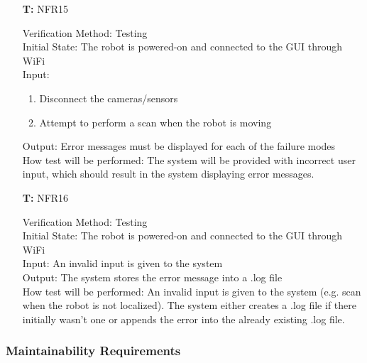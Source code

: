 \documentclass[12pt, titlepage]{article}
\newcounter{tnum} %
\begin{document}
\begin{itemize}

\item[\textbf{T\refstepcounter{tnum}\thetnum:}]{NFR15\\}

Verification Method: Testing\\					
Initial State: 	The robot is powered-on and connected to the GUI through WiFi	\\
Input: \begin{enumerate}
	\item Disconnect the cameras/sensors
	\item Attempt to perform a scan when the robot is moving
	\end{enumerate}
Output: Error messages must be displayed for each of the failure modes\\
How test will be performed: The system will be provided with incorrect user input, which should result in the system displaying error messages.\\

\item[\textbf{T\refstepcounter{tnum}\thetnum:}]{NFR16\\}

Verification Method: Testing\\					
Initial State: The robot is powered-on and connected to the GUI through WiFi	\\
Input: An invalid input is given to the system\\
Output: The system stores the error message into a .log file\\
How test will be performed: An invalid input is given to the system (e.g. scan when the robot is not localized). The system either creates a .log file if there initially wasn't one or appends the error into the already existing .log file.\\
\end{itemize}

\subsubsection{Maintainability Requirements}
\end{document}
